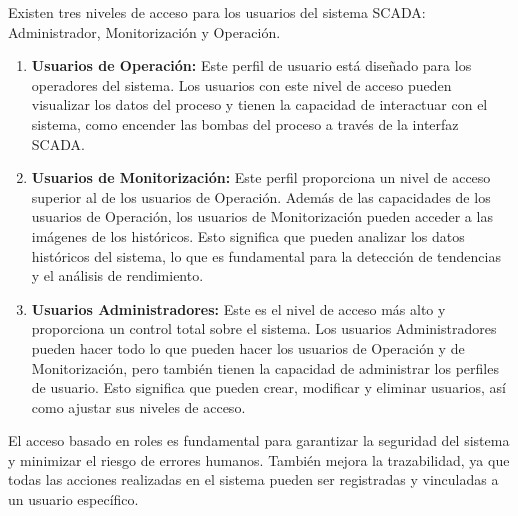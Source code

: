 Existen tres niveles de acceso para los usuarios del sistema SCADA: Administrador, Monitorización y Operación.\\

\begin{enumerate}
	\item \textbf{Usuarios de Operación:}  Este perfil de usuario está diseñado para los operadores del sistema. Los usuarios con este nivel de acceso pueden visualizar los datos del proceso y tienen la capacidad de interactuar con el sistema, como encender las bombas del proceso a través de la interfaz SCADA.


	\item \textbf{	Usuarios de Monitorización:} Este perfil proporciona un nivel de acceso superior al de los usuarios de Operación. Además de las capacidades de los usuarios de Operación, los usuarios de Monitorización pueden acceder a las imágenes de los históricos. Esto significa que pueden analizar los datos históricos del sistema, lo que es fundamental para la detección de tendencias y el análisis de rendimiento.


	\item \textbf{Usuarios Administradores:}  Este es el nivel de acceso más alto y proporciona un control total sobre el sistema. Los usuarios Administradores pueden hacer todo lo que pueden hacer los usuarios de Operación y de Monitorización, pero también tienen la capacidad de administrar los perfiles de usuario. Esto significa que pueden crear, modificar y eliminar usuarios, así como ajustar sus niveles de acceso.
	
	\end{enumerate}
	


El acceso basado en roles es fundamental para garantizar la seguridad del sistema y minimizar el riesgo de errores humanos. También mejora la trazabilidad, ya que todas las acciones realizadas en el sistema pueden ser registradas y vinculadas a un usuario específico.\\
